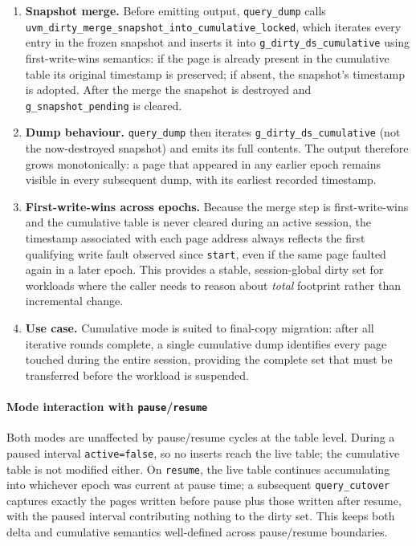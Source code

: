 \begin{enumerate}
    \item \textbf{Snapshot merge.}
          Before emitting output, \texttt{query\_dump} calls
          \texttt{uvm\_dirty\_merge\_snapshot\_into\_cumulative\_locked}, which
          iterates every entry in the frozen snapshot and inserts it into
          \texttt{g\_dirty\_ds\_cumulative} using first-write-wins semantics:
          if the page is already present in the cumulative table its original
          timestamp is preserved; if absent, the snapshot's timestamp is adopted.
          After the merge the snapshot is destroyed and \texttt{g\_snapshot\_pending}
          is cleared.

    \item \textbf{Dump behaviour.}
          \texttt{query\_dump} then iterates \texttt{g\_dirty\_ds\_cumulative}
          (not the now-destroyed snapshot) and emits its full contents.
          The output therefore grows monotonically: a page that appeared in any
          earlier epoch remains visible in every subsequent dump, with its
          earliest recorded timestamp.

    \item \textbf{First-write-wins across epochs.}
          Because the merge step is first-write-wins and the cumulative table
          is never cleared during an active session, the timestamp associated
          with each page address always reflects the first qualifying write
          fault observed since \texttt{start}, even if the same page faulted
          again in a later epoch. This provides a stable, session-global dirty
          set for workloads where the caller needs to reason about \emph{total}
          footprint rather than incremental change.

    \item \textbf{Use case.}
          Cumulative mode is suited to final-copy migration: after all
          iterative rounds complete, a single cumulative dump identifies every
          page touched during the entire session, providing the complete set that
          must be transferred before the workload is suspended.
\end{enumerate}

\paragraph{Mode interaction with \texttt{pause}/\texttt{resume}}
Both modes are unaffected by pause/resume cycles at the table level.
During a paused interval \texttt{active=false}, so no inserts reach the live
table; the cumulative table is not modified either.
On \texttt{resume}, the live table continues accumulating into whichever epoch
was current at pause time; a subsequent \texttt{query\_cutover} captures
exactly the pages written before pause plus those written after resume,
with the paused interval contributing nothing to the dirty set.
This keeps both delta and cumulative semantics well-defined across
pause/resume boundaries.

